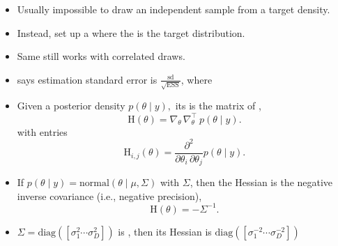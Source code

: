 \documentclass[10pt]{report}
\begin{document}
\begin{itemize}
\item Usually impossible to draw an independent sample from a target density.
\item Instead, set up a  where the 
  is the target distribution.
\item Same  still works with correlated draws.
\item {} says estimation standard error is
  $\frac{\textrm{sd}}{\sqrt{\textrm{ESS}}}$, where
\end{itemize}



\begin{itemize}
\item Given a posterior density $p(\theta \mid y),$ its  is the
  matrix of ,
  $$
  \textrm{H}(\theta) = \nabla_{\!\!\theta} \, \nabla_{\!\!\theta}^\top \ p(\theta \mid y).
  $$
  with entries
  $$
  \textrm{H}_{i, j}(\theta) = \frac{\partial^2}{\partial \theta_i \, \partial
    \theta_j} p(\theta \mid y).
  $$
\item If $p(\theta \mid y) = \textrm{normal}(\theta \mid \mu, \Sigma)$ with
   $\Sigma$, then the Hessian is the
  negative inverse covariance (i.e., negative precision),
  $$
  \textrm{H}(\theta) = -\Sigma^{-1}.
  $$
\item 
  
  $\Sigma = \textrm{diag}([\sigma_1^2 \cdots \sigma_D^2])$ is
  , then its Hessian is $\textrm{diag}([\sigma_1^{-2} \cdots
  \sigma_D^{-2}])$
\end{itemize}

\end{document}
